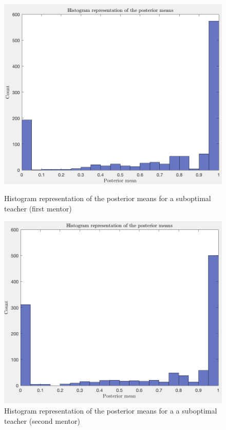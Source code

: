 \documentclass[a4paper]{report}
\begin{document}
{{{{				\begin{figure}[ht!]
					\begin{minipage}{0.5\linewidth}
						\begin{center}
							\includegraphics[width=0.95\linewidth]{post_mean_50}
							\caption{Histogram representation of the posterior means for a suboptimal teacher (first mentor)}
							\label{fig::post_mean_120}
						\end{center}
					\end{minipage}
					\begin{minipage}{0.5\linewidth}
						\begin{center}
							\includegraphics[width=0.95\linewidth]{post_mean_120}
							\caption{Histogram representation of the posterior means for a a suboptimal teacher (second mentor)}
							\label{fig::post_mean_50}
						\end{center}
					\end{minipage}
				\end{figure}
				
}}}}
\end{document}

